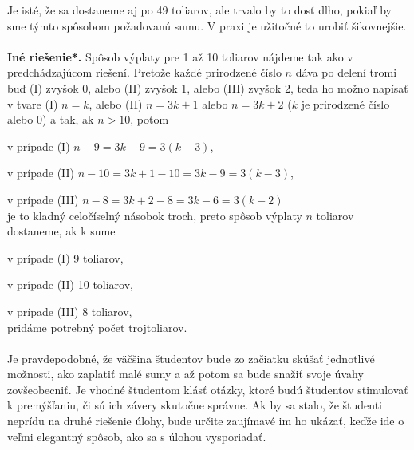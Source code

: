 {{Je isté, že sa dostaneme aj po 49 toliarov, ale trvalo by to dosť dlho, pokiaľ by sme týmto spôsobom  požadovanú sumu. V praxi je užitočné to urobiť šikovnejšie.\\
\\
\textbf{Iné riešenie*.} Spôsob výplaty pre 1 až 10 toliarov nájdeme tak ako v predchádzajúcom riešení. Pretože každé prirodzené číslo $n$ dáva po delení tromi buď (I) zvyšok 0, alebo (II) zvyšok 1, alebo (III) zvyšok 2, teda ho možno napísať v tvare (I) $n=k$, alebo (II) $n=3k+1$ alebo $n=3k+2$ ($k$ je prirodzené číslo alebo 0) a tak, ak $n>10$, potom

v prípade (I) $n-9=3k-9=3(k-3)$,

v prípade (II) $n-10=3k+1-10=3k-9=3(k-3)$,

v prípade (III) $n-8=3k+2-8=3k-6=3(k-2)$\\
je to kladný celočíselný násobok troch, preto spôsob výplaty $n$ toliarov dostaneme, ak k sume

v prípade (I) 9 toliarov, 

v prípade (II) 10 toliarov,

v prípade (III) 8 toliarov, \\
pridáme potrebný počet trojtoliarov.\\
\\
\kom Je pravdepodobné, že väčšina študentov bude zo začiatku skúšať jednotlivé možnosti, ako zaplatiť malé sumy a až potom sa bude snažiť svoje úvahy zovšeobecniť. Je vhodné študentom klásť otázky, ktoré budú študentov stimulovať k premýšľaniu, či sú ich závery skutočne správne. Ak by sa stalo, že študenti neprídu na druhé riešenie úlohy, bude určite zaujímavé im ho ukázať, keďže ide o veľmi elegantný spôsob, ako sa s úlohou vysporiadať.\\
\\
}

}
